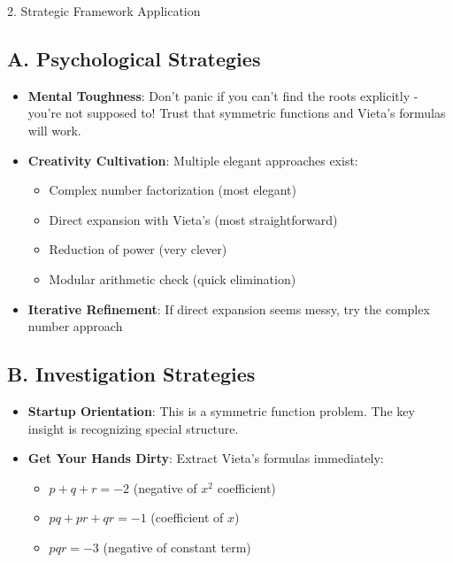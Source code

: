 \documentclass[12pt]{article}
\begin{document}
\begin{strategybox}{2. Strategic Framework Application}

\subsection*{A. Psychological Strategies}
\begin{itemize}[leftmargin=*]
    \item \textbf{Mental Toughness}: Don't panic if you can't find the roots explicitly - you're not supposed to! Trust that symmetric functions and Vieta's formulas will work.
    
    \item \textbf{Creativity Cultivation}: Multiple elegant approaches exist:
    \begin{itemize}
        \item Complex number factorization (most elegant)
        \item Direct expansion with Vieta's (most straightforward)
        \item Reduction of power (very clever)
        \item Modular arithmetic check (quick elimination)
    \end{itemize}
    
    \item \textbf{Iterative Refinement}: If direct expansion seems messy, try the complex number approach
\end{itemize}

\subsection*{B. Investigation Strategies}
\begin{itemize}[leftmargin=*]
    \item \textbf{Startup Orientation}: This is a symmetric function problem. The key insight is recognizing special structure.
    
    \item \textbf{Get Your Hands Dirty}: Extract Vieta's formulas immediately:
    \begin{itemize}
        \item $p + q + r = -2$ (negative of $x^2$ coefficient)
        \item $pq + pr + qr = -1$ (coefficient of $x$)
        \item $pqr = -3$ (negative of constant term)
    \end{itemize}
    

\end{itemize}
\end{strategybox}
\end{document}

